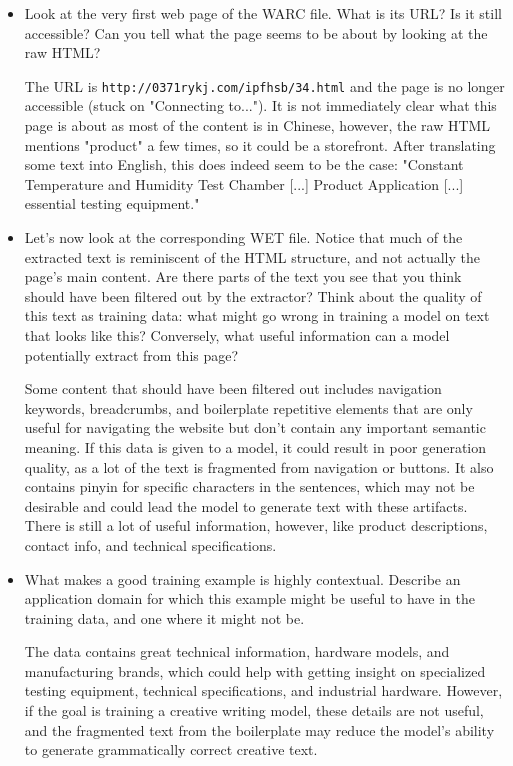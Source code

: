 \documentclass[letterpaper]{article}
\begin{document}
\begin{itemize}
	\item[(a)] Look at the very first web page of the WARC file. What is its URL? Is it still accessible? Can you tell what the page seems to be about by looking at the raw HTML?

	The URL is \texttt{http://0371rykj.com/ipfhsb/34.html} and the page is no longer accessible (stuck on "Connecting to..."). It is not immediately clear what this page is about as most of the content is in Chinese, however, the raw HTML mentions "product" a few times, so it could be a storefront. After translating some text into English, this does indeed seem to be the case: "Constant Temperature and Humidity Test Chamber [...] Product Application [...] essential testing equipment."

	\item[(b)] Let’s now look at the corresponding WET file. Notice that much of the extracted text is reminiscent of the HTML structure, and not actually the page’s main content. Are there parts of the text you see that you think should have been filtered out by the extractor? Think about the quality of this text as training data: what might go wrong in training a model on text that looks like this? Conversely, what useful information can a model potentially extract from this page?

	Some content that should have been filtered out includes navigation keywords, breadcrumbs, and boilerplate repetitive elements that are only useful for navigating the website but don't contain any important semantic meaning. If this data is given to a model, it could result in poor generation quality, as a lot of the text is fragmented from navigation or buttons. It also contains pinyin for specific characters in the sentences, which may not be desirable and could lead the model to generate text with these artifacts. There is still a lot of useful information, however, like product descriptions, contact info, and technical specifications.

	\item[(c)] What makes a good training example is highly contextual. Describe an application domain for which this example might be useful to have in the training data, and one where it might not be.

	The data contains great technical information, hardware models, and manufacturing brands, which could help with getting insight on specialized testing equipment, technical specifications, and industrial hardware. However, if the goal is training a creative writing model, these details are not useful, and the fragmented text from the boilerplate may reduce the model's ability to generate grammatically correct creative text.


\end{itemize}
\end{document}
